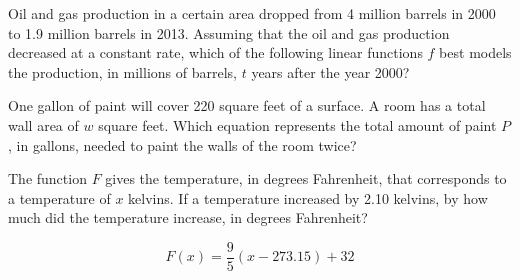 \vspace{0.75em}


\vspace{2em}

\noindent\markforreview

\vspace{1em}

Oil and gas production in a certain area dropped from 4 million barrels in 2000 to 1.9 million barrels in 2013. Assuming that the oil and gas production decreased at a constant rate, which of the following linear functions \( f \) best models the production, in millions of barrels, \( t \) years after the year 2000?

\vspace{0.75em}


\newpage



\noindent\markforreview

\vspace{1em}

One gallon of paint will cover 220 square feet of a surface. A room has a total wall area of \( w \) square feet. Which equation represents the total amount of paint \( P \), in gallons, needed to paint the walls of the room twice?

\vspace{0.75em}


\vspace{2em}

\noindent\markforreview

\vspace{1em}

The function \( F \) gives the temperature, in degrees Fahrenheit, that corresponds to a temperature of \( x \) kelvins. If a temperature increased by 2.10 kelvins, by how much did the temperature increase, in degrees Fahrenheit?

\[
F(x) = \frac{9}{5}(x - 273.15) + 32
\]

\vspace{0.75em}


